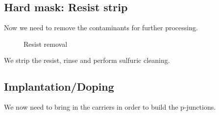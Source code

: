 \subsection{Hard mask: Resist strip}

Now we need to remove the contaminants for further processing.

\begin{figure}[H]
	\centering
	\begin{tikzpicture}[node distance = 3cm, auto, thick,scale=\CrossSectionOnly, every node/.style={transform shape}]
		
	\end{tikzpicture}
	\drawStepArrow{}
	\begin{tikzpicture}[node distance = 3cm, auto, thick,scale=\CrossSectionOnly, every node/.style={transform shape}]
		
	\end{tikzpicture}
	\caption{Resist removal}
\end{figure}

We strip the resist, rinse and perform sulfuric cleaning.

\newpage

\subsection{Implantation/Doping}\label{pimplant_implant_step}

We now need to bring in the carriers in order to build the p-junctions.


